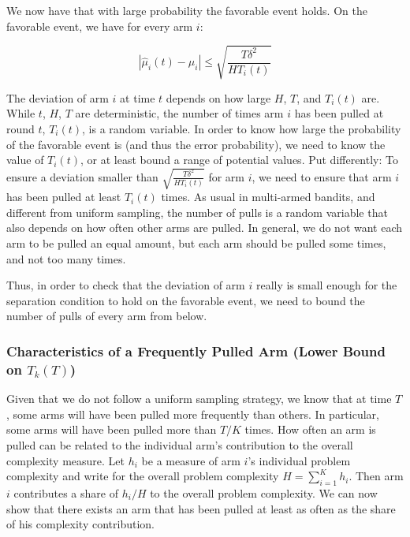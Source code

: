 \documentclass[11pt,]{article}
\begin{document}
We now have that with large probability the favorable event holds. On
the favorable event, we have for every arm \(i\):

\[
| \hat{\mu}_i(t) - \mu_i| \leq \sqrt{\frac{T\delta^2}{HT_i(t)}}
\]

The deviation of arm \(i\) at time \(t\) depends on how large \(H\),
\(T\), and \(T_i(t)\) are. While \(t\), \(H\), \(T\) are deterministic,
the number of times arm \(i\) has been pulled at round \(t\),
\(T_i(t)\), is a random variable. In order to know how large the
probability of the favorable event is (and thus the error probability),
we need to know the value of \(T_i(t)\), or at least bound a range of
potential values. Put differently: To ensure a deviation smaller than
\(\sqrt{\frac{T\delta^2}{HT_i(t)}}\) for arm \(i\), we need to ensure
that arm \(i\) has been pulled at least \(T_i(t)\) times. As usual in
multi-armed bandits, and different from uniform sampling, the number of
pulls is a random variable that also depends on how often other arms are
pulled. In general, we do not want each arm to be pulled an equal
amount, but each arm should be pulled some times, and not too many
times.

Thus, in order to check that the deviation of arm \(i\) really is small
enough for the separation condition to hold on the favorable event, we
need to bound the number of pulls of every arm from below.

\subsubsection{\texorpdfstring{Characteristics of a Frequently Pulled
Arm (Lower Bound on
\(T_k(T)\))}{Characteristics of a Frequently Pulled Arm (Lower Bound on T\_k(T))}}\label{characteristics-of-a-frequently-pulled-arm-lower-bound-on-t_kt}

Given that we do not follow a uniform sampling strategy, we know that at
time \(T\), some arms will have been pulled more frequently than others.
In particular, some arms will have been pulled more than \(T/K\) times.
How often an arm is pulled can be related to the individual arm's
contribution to the overall complexity measure. Let \(h_i\) be a measure
of arm \(i\)'s individual problem complexity and write for the overall
problem complexity \(H = \sum_{i = 1}^{K} h_i\). Then arm \(i\)
contributes a share of \(h_i/H\) to the overall problem complexity. We
can now show that there exists an arm that has been pulled at least as
often as the share of his complexity contribution.
\end{document}
